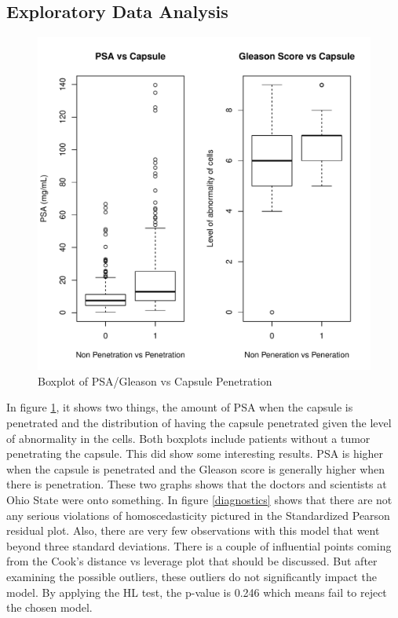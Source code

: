 \documentclass{article}\usepackage[]{graphicx}\usepackage[]{color}
\makeatletter
\def\maxwidth{ %
  \ifdim\Gin@nat@width>\linewidth
    \linewidth
  \else
    \Gin@nat@width
  \fi
}
\newenvironment{knitrout}{}{} %
\makeatother
\begin{document}
\subsection{Exploratory Data Analysis}
\begin{figure}
\caption{Boxplot of PSA/Gleason vs Capsule Penetration}
\label{boxplot}
\begin{knitrout}
\color{fgcolor}
\includegraphics[width=\maxwidth,height=0.4\textheight]{figure/Boxplot-1} 

\end{knitrout}
\end{figure}
\qquad In figure \ref{boxplot}, it shows two things, the amount of PSA when the capsule is penetrated and the distribution of having the capsule penetrated given the level of abnormality in the cells. Both boxplots include patients without a tumor penetrating the capsule. This did show some interesting results. PSA is higher when the capsule is penetrated and the Gleason score is generally higher when there is penetration. These two graphs shows that the doctors and scientists at Ohio State were onto something. In figure \ref{diagnostics} shows that there are not any serious violations of homoscedasticity pictured in the Standardized Pearson residual plot. Also, there are very few observations with this model that went beyond three standard deviations. There is a couple of influential points coming from the Cook's distance vs leverage plot that should be discussed. But after examining the possible outliers, these outliers do not significantly impact the model. By applying the HL test, the p-value is 0.246 which means fail to reject the chosen model. 
\end{document}
